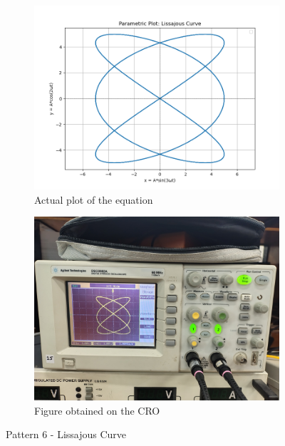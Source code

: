 \documentclass[12pt]{article}
\begin{document}
\begin{figure}[htbp]
    \centering
    \begin{subfigure}[b]{0.45\textwidth}
        \centering
        \includegraphics[width=\textwidth]{figs/Experiment-1/Observation-6/Figure_1.jpg}
        \caption{Actual plot of the equation}
    \end{subfigure}
    \hfill
    \begin{subfigure}[b]{0.45\textwidth}
        \centering
        \includegraphics[width=\textwidth]{figs/Experiment-1/Observation-6/Figure_2.png}
        \caption{Figure obtained on the CRO}
    \end{subfigure}
    \caption{Pattern 6 - Lissajous Curve}
\end{figure}
\end{document}
